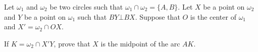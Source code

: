 Let $\omega_1$ and $\omega_2$ be two circles such that $ \omega_1 \cap \omega_2 = \{ A,B\}$. Let $X$ be a point on $\omega_2$ and $Y$ be a point on $\omega_1$ such that $BY \bot BX$. Suppose that $O$ is the center of $\omega_1$ and $X' = \omega_2 \cap OX$.

If $ K = \omega_2 \cap X'Y$, prove that $ X $ is the midpoint of the arc $AK$.
